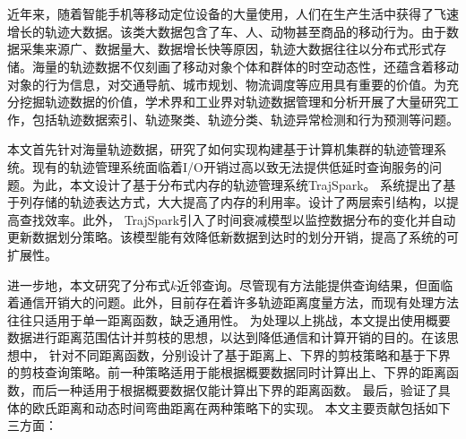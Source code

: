 \chapter*{}
近年来，随着智能手机等移动定位设备的大量使用，人们在生产生活中获得了飞速增长的轨迹大数据。该类大数据包含了车、人、动物甚至商品的移动行为。由于数据采集来源广、数据量大、数据增长快等原因，轨迹大数据往往以分布式形式存储。海量的轨迹数据不仅刻画了移动对象个体和群体的时空动态性，还蕴含着移动对象的行为信息，对交通导航、城市规划、物流调度等应用具有重要的价值。为充分挖掘轨迹数据的价值，学术界和工业界对轨迹数据管理和分析开展了大量研究工作，包括轨迹数据索引、轨迹聚类、轨迹分类、轨迹异常检测和行为预测等问题。

本文首先针对海量轨迹数据，研究了如何实现构建基于计算机集群的轨迹管理系统。现有的轨迹管理系统面临着I/O开销过高以致无法提供低延时查询服务的问题。为此，本文设计了基于分布式内存的轨迹管理系统TrajSpark。
系统提出了基于列存储的轨迹表达方式，大大提高了内存的利用率。设计了两层索引结构，以提高查找效率。此外，
TrajSpark引入了时间衰减模型以监控数据分布的变化并自动更新数据划分策略。该模型能有效降低新数据到达时的划分开销，提高了系统的可扩展性。

进一步地，本文研究了分布式$k$近邻查询。尽管现有方法能提供查询结果，但面临着通信开销大的问题。此外，目前存在着许多轨迹距离度量方法，而现有处理方法往往只适用于单一距离函数，缺乏通用性。
为处理以上挑战，本文提出使用概要数据进行距离范围估计并剪枝的思想，以达到降低通信和计算开销的目的。在该思想中，
针对不同距离函数，分别设计了基于距离上、下界的剪枝策略和基于下界的剪枝查询策略。前一种策略适用于能根据概要数据同时计算出上、下界的距离函数，而后一种适用于根据概要数据仅能计算出下界的距离函数。
最后，验证了具体的欧氏距离和动态时间弯曲距离在两种策略下的实现。
本文主要贡献包括如下三方面：

